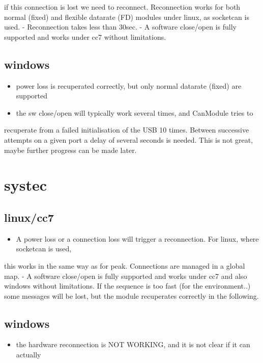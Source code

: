 \documentclass[letterpaper,10pt,english]{sphinxmanual}
\begin{document}
if this connection is lost we need to reconnect. Reconnection works for both normal (fixed)
and flexible datarate (FD) modules under linux, as socketcan is used.
- Reconnection takes less than 30sec.
- A software close/open is fully supported and works under cc7 without limitations.


\subsection{windows}
\label{\detokenize{reconnection:windows}}\begin{itemize}
\item {} 
power loss is recuperated correctly, but only normal datarate (fixed) are supported

\item {} 
the sw close/open will typically work several times, and CanModule tries to

\end{itemize}

recuperate from a failed initialisation of the USB 10 times. Between successive attempts on a
given port a delay of several seconds is needed. This is not great, maybe further progress
can be made later.


\section{systec}
\label{\detokenize{reconnection:systec}}

\subsection{linux/cc7}
\label{\detokenize{reconnection:id1}}\begin{itemize}
\item {} 
A power loss or a connection loss will trigger a reconnection. For linux, where socketcan is used,

\end{itemize}

this works in the same way as for peak. Connections are managed in a global map.
- A software close/open is fully supported and works under cc7 and also windows without limitations.
If the sequence is too fast (for the environment..) some messages will be lost, but the
module recuperates correctly in the following.


\subsection{windows}
\label{\detokenize{reconnection:id2}}\begin{itemize}
\item {} 
the hardware reconnection is NOT WORKING, and it is not clear if it can actually

\end{itemize}
\end{document}

